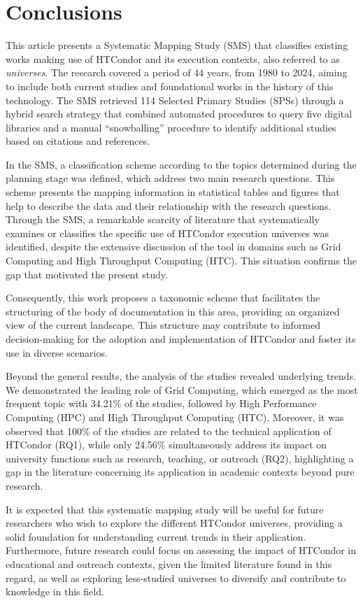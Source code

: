 \section{Conclusions}\label{sec:conclusiones}

This article presents a Systematic Mapping Study (SMS) that classifies existing works making use of HTCondor and its execution contexts, also referred to as \textit{universes}. The research covered a period of 44 years, from 1980 to 2024, aiming to include both current studies and foundational works in the history of this technology. The SMS retrieved 114 Selected Primary Studies (SPSs) through a hybrid search strategy that combined automated procedures to query five digital libraries and a manual “snowballing” procedure to identify additional studies based on citations and references.

In the SMS, a classification scheme according to the topics determined during the planning stage was defined, which address two main research questions. This scheme presents the mapping information in statistical tables and figures that help to describe the data and their relationship with the research questions. Through the SMS, a remarkable scarcity of literature that systematically examines or classifies the specific use of HTCondor execution universes was identified, despite the extensive discussion of the tool in domains such as Grid Computing and High Throughput Computing (HTC). This situation confirms the gap that motivated the present study.

Consequently, this work proposes a taxonomic scheme that facilitates the structuring of the body of documentation in this area, providing an organized view of the current landscape. This structure may contribute to informed decision-making for the adoption and implementation of HTCondor and foster its use in diverse scenarios.

Beyond the general results, the analysis of the studies revealed underlying trends. We demonstrated the leading role of Grid Computing, which emerged as the most frequent topic with 34.21\% of the studies, followed by High Performance Computing (HPC) and High Throughput Computing (HTC). Moreover, it was observed that 100\% of the studies are related to the technical application of HTCondor (RQ1), while only 24.56\% simultaneously address its impact on university functions such as research, teaching, or outreach (RQ2), highlighting a gap in the literature concerning its application in academic contexts beyond pure research.

It is expected that this systematic mapping study will be useful for future researchers who wish to explore the different HTCondor universes, providing a solid foundation for understanding current trends in their application. Furthermore, future research could focus on assessing the impact of HTCondor in educational and outreach contexts, given the limited literature found in this regard, as well as exploring less-studied universes to diversify and contribute to knowledge in this field.
